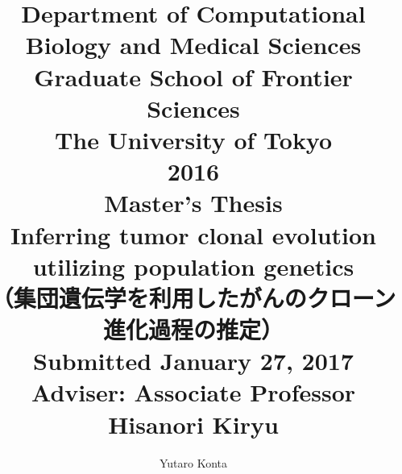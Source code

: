 \documentclass[12pt]{article}
\begin{document}
\title{{\large Department of Computational Biology and Medical Sciences\\Graduate School of Frontier Sciences\\The University of Tokyo}\vspace{4cm}\\2016\\Master's Thesis\vspace{1cm}\\Inferring tumor clonal evolution utilizing population genetics\\（集団遺伝学を利用したがんのクローン進化過程の推定）\vspace{3cm}\\{\large Submitted January 27, 2017\\Adviser: Associate Professor Hisanori Kiryu}\vspace{3cm}}
\author{{\Large Yutaro Konta}}
\date{}
\maketitle
\thispagestyle{empty}
\newpage



\newpage
\tableofcontents
\listoftables
\listoffigures
\newpage














\end{document}
